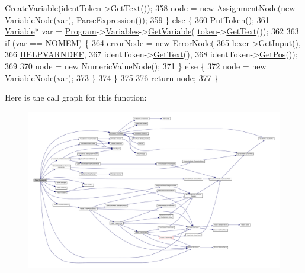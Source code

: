 \begin{DoxyCode}
      \hyperlink{classVariableList_ac78b3d52283bec7cbd8e7e2d217e1608}{CreateVariable}(identToken->\hyperlink{structToken_a15f1043de07ce8e452fbf115b85def71}{GetText}());
358         node = \textcolor{keyword}{new} \hyperlink{classAssignmentNode}{AssignmentNode}(\textcolor{keyword}{new} \hyperlink{classVariableNode}{VariableNode}(var), 
      \hyperlink{classParser_ae46b0a87abe76f40ae117c5bdcb2f29d}{ParseExpression}());
359     \} \textcolor{keywordflow}{else} \{
360         \hyperlink{classParser_adb5c3a188b36f7ecb198ae30f06338b3}{PutToken}();
361         \hyperlink{classVariable}{Variable}* var = \hyperlink{classProgram}{Program}->\hyperlink{classProgram_a1d4f53befb0270e64c91c24d14061188}{Variables}->\hyperlink{classVariableList_a2002862abdb75e088e2dd6bf1e140be6}{GetVariable}(
      \hyperlink{classParser_a467028559d31c5b33f16ca8be56715cc}{token}->\hyperlink{structToken_a15f1043de07ce8e452fbf115b85def71}{GetText}());
362 
363         \textcolor{keywordflow}{if} (var == \hyperlink{platform_8h_a46ff2bfbf0d44b8466a2251d5bd5e6f8}{NOMEM}) \{
364             \hyperlink{classParser_ab482ff79113ad2f1ef60bc6dd18528d1}{errorNode} = \textcolor{keyword}{new} \hyperlink{classErrorNode}{ErrorNode}(
365                 \hyperlink{classParser_a8a8214126b0b0455e3ce375f3e9b20bf}{lexer}->\hyperlink{classLexer_a3032cbeb851294bccd61b722d9a86265}{GetInput}(),
366                 \hyperlink{text_8h_a9a06b887cb924e98bf181b08a517e072}{HELPVARNDEF},
367                 identToken->\hyperlink{structToken_a15f1043de07ce8e452fbf115b85def71}{GetText}(),
368                 identToken->\hyperlink{structToken_a5f93ea94940a6eeb060507e1da594599}{GetPos}());
369 
370             node = \textcolor{keyword}{new} \hyperlink{classNumericValueNode}{NumericValueNode}();
371         \} \textcolor{keywordflow}{else} \{
372             node = \textcolor{keyword}{new} \hyperlink{classVariableNode}{VariableNode}(var);
373         \}
374     \}
375 
376     \textcolor{keywordflow}{return} node;
377 \}
\end{DoxyCode}


Here is the call graph for this function\+:\nopagebreak
\begin{figure}[H]
\begin{center}
\leavevmode
\includegraphics[width=350pt]{classParser_a84af27a6f4e42888eba6ac36ccd0815c_cgraph}
\end{center}
\end{figure}




